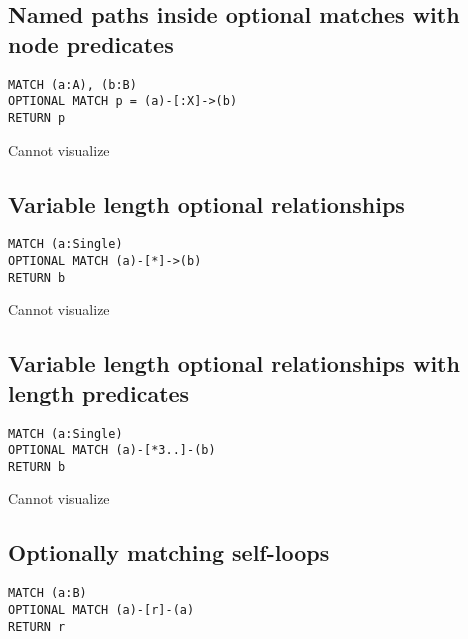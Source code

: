 \subsection{Named paths inside optional matches with node predicates}

\begin{lstlisting}
MATCH (a:A), (b:B)
OPTIONAL MATCH p = (a)-[:X]->(b)
RETURN p
\end{lstlisting}

Cannot visualize
\subsection{Variable length optional relationships}

\begin{lstlisting}
MATCH (a:Single)
OPTIONAL MATCH (a)-[*]->(b)
RETURN b
\end{lstlisting}

Cannot visualize
\subsection{Variable length optional relationships with length predicates}

\begin{lstlisting}
MATCH (a:Single)
OPTIONAL MATCH (a)-[*3..]-(b)
RETURN b
\end{lstlisting}

Cannot visualize
\subsection{Optionally matching self-loops}

\begin{lstlisting}
MATCH (a:B)
OPTIONAL MATCH (a)-[r]-(a)
RETURN r
\end{lstlisting}

